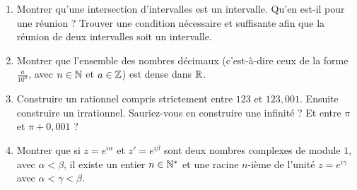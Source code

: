 \begin{frame}
\begin{miniexercice}
\begin{enumerate}
  \item Montrer qu'une intersection d'intervalles est un intervalle. Qu'en est-il pour une réunion ?
Trouver une condition nécessaire et suffisante afin que la réunion de deux intervalles soit un intervalle.
  \item Montrer que l'ensemble des nombres décimaux (c'est-à-dire ceux de la forme 
$\frac{a}{10^n}$, avec $n\in \mathbb{N}$ et $a\in \mathbb{Z}$) est dense dans $\mathbb{R}$. 
  \item Construire un rationnel compris strictement entre $123$ et $123,001$. Ensuite construire un irrationnel. 
Sauriez-vous en construire une infinité ? Et entre $\pi$ et $\pi+0,001$ ?
  \item Montrer que si $z=e^{i\alpha}$ et $z'=e^{i\beta}$ sont deux nombres complexes de module $1$, 
avec $\alpha<\beta$, il existe un entier $n\in \mathbb{N}^*$ et une racine $n$-ième de  
l'unité $z=e^{i\gamma}$ avec $\alpha<\gamma<\beta$.
\end{enumerate}

\end{miniexercice}
\end{frame}



